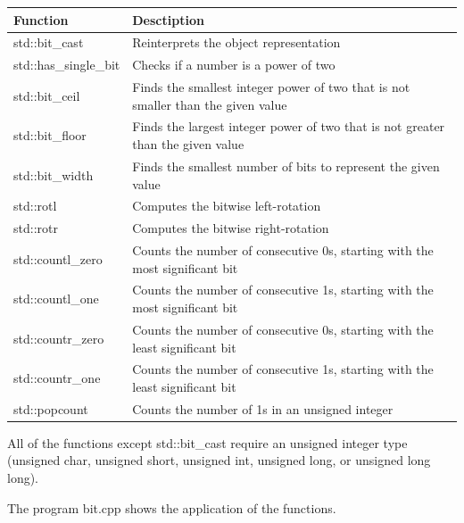\begin{table}[H]
\begin{tabular}{ll}
\textbf{Function}     & \textbf{Desctiption}                                                             \\ \hline
std::bit\_cast        & Reinterprets the object representation                                           \\
std::has\_single\_bit & Checks if a number is a power of two                                             \\
std::bit\_ceil        & Finds the smallest integer power of two that is not smaller than the given value \\
std::bit\_floor       & Finds the largest integer power of two that is not greater than the given value  \\
std::bit\_width       & Finds the smallest number of bits to represent the given value                   \\
std::rotl             & Computes the bitwise left-rotation                                               \\
std::rotr             & Computes the bitwise right-rotation                                              \\
std::countl\_zero     & Counts the number of consecutive 0s, starting with the most significant bit      \\
std::countl\_one      & Counts the number of consecutive 1s, starting with the most significant bit      \\
std::countr\_zero     & Counts the number of consecutive 0s, starting with the least significant bit     \\
std::countr\_one      & Counts the number of consecutive 1s, starting with the least significant bit     \\
std::popcount         & Counts the number of 1s in an unsigned integer                                  
\end{tabular}
\end{table}

All of the functions except std::bit\_cast require an unsigned integer type (unsigned char, unsigned short, unsigned int, unsigned long, or unsigned long long).

The program bit.cpp shows the application of the functions.

